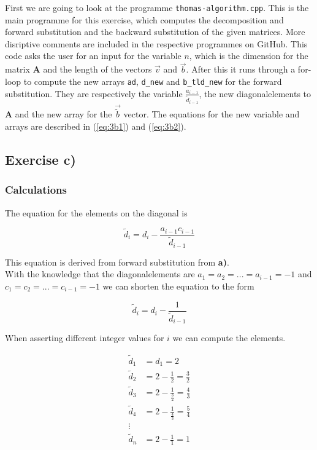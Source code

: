 \documentclass{article}
\begin{document}
    First we are going to look at the programme \texttt{thomas-algorithm.cpp}. This is the main programme for this exercise, which computes the decomposition and forward substitution and the backward substitution of the given matrices. More disriptive comments are included in the respective programmes on GitHub. This code asks the user for an input for the variable $n$, which is the dimension for the matrix \textbf{A} and the length of the vectors $\vec{v}$ and $\vec{b}$. After this it runs through a for-loop to compute the new arrays \texttt{ad}, \texttt{d\_new} and \texttt{b\_tld\_new} for the forward substitution. They are respectively the variable $\frac{a_{i-1}}{\tilde{d}_{i-1}}$, the new diagonalelements to \textbf{A} and the new array for the $\vec{\tilde{b}}$ vector. The equations for the new variable and arrays are described in
    (\ref{eq:3b1}) and (\ref{eq:3b2}). 


\subsection{Exercise c)}

  \subsubsection{Calculations}

    The equation for the elements on the diagonal is

    \begin{equation*}
      \tilde{d}_i = d_i - \frac{a_{i-1} c_{i-1}}{\tilde{d}_{i-1}}
    \end{equation*}

    This equation is derived from forward substitution from \textbf{a)}. \\

    With the knowledge that the diagonalelements are $a_1 = a_2 = ... = a_{i-1} = -1 $ and $c_1 = c_2 = ... = c_{i-1} = -1$ we can shorten the equation to the form

    \begin{equation*}
      \tilde{d}_i = d_i - \frac{1}{\tilde{d}_{i-1}}
    \end{equation*}

    When asserting different integer values for $i$ we can compute the elements.

    \begin{align*}
      \tilde{d}_1 &= d_1 = 2 \\
      \tilde{d}_2 &= 2 - \frac{1}{2} = \frac{3}{2} \\
      \tilde{d}_3 &= 2 - \frac{1}{\frac{3}{2}} = \frac{4}{3} \\
      \tilde{d}_4 &= 2 - \frac{1}{\frac{4}{3}} = \frac{5}{4} \\
      \vdots \\
      \tilde{d}_n &= 2 - \frac{1}{1} = 1 \\
    \end{align*}
\end{document}
